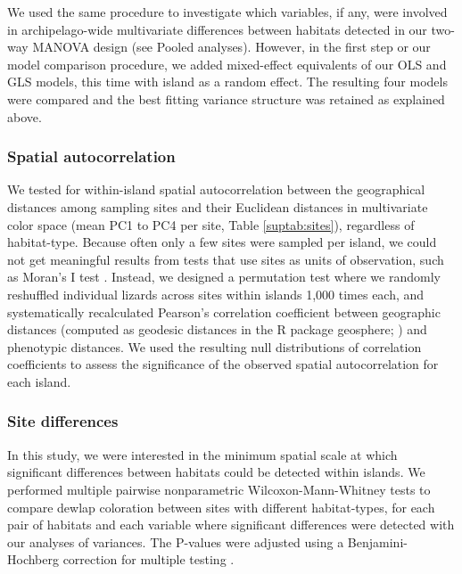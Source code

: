 We used the same procedure to investigate which variables, if any, were involved in archipelago-wide multivariate differences between habitats detected in our two-way MANOVA design (see Pooled analyses). However, in the first step or our model comparison procedure, we added mixed-effect equivalents of our OLS and GLS models, this time with island as a random effect. The resulting four models were compared and the best fitting variance structure was retained as explained above.

\subsubsection*{Spatial autocorrelation}

We tested for within-island spatial autocorrelation between the geographical distances among sampling sites and their Euclidean distances in multivariate color space (mean PC1 to PC4 per site, Table \ref{suptab:sites}), regardless of habitat-type. Because often only a few sites were sampled per island, we could not get meaningful results from tests that use sites as units of observation, such as Moran's I test \citep{Gittleman1990}. Instead, we designed a permutation test where we randomly reshuffled individual lizards across sites within islands 1,000 times each, and systematically recalculated Pearson's correlation coefficient between geographic distances (computed as geodesic distances in the R package geosphere; \citealt{Hijmans2019}) and phenotypic distances. We used the resulting null distributions of correlation coefficients to assess the significance of the observed spatial autocorrelation for each island.

\subsubsection*{Site differences}

In this study, we were interested in the minimum spatial scale at which significant differences between habitats could be detected within islands. We performed multiple pairwise nonparametric Wilcoxon-Mann-Whitney tests \citep{Hollander2013} to compare dewlap coloration between sites with different habitat-types, for each pair of habitats and each variable where significant differences were detected with our analyses of variances. The P-values were adjusted using a Benjamini-Hochberg correction for multiple testing \citep{Benjamini1995}.